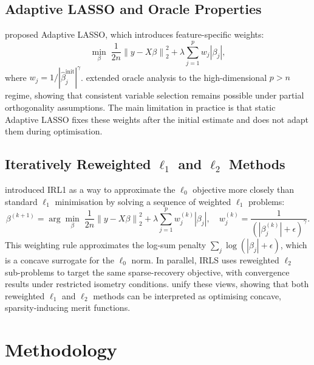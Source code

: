 \documentclass[12pt,a4paper]{article}
\newcommand{\norm}[1]{\left\|#1\right\|}
\newcommand{\abs}[1]{\left|#1\right|}
\begin{document}
\subsection{Adaptive LASSO and Oracle Properties}

\citet{zou2006} proposed Adaptive LASSO, which introduces feature-specific weights:
\begin{equation}
    \min_{\beta} \; \frac{1}{2n}\norm{y - X\beta}_2^2
    + \lambda \sum_{j=1}^{p} w_j \abs{\beta_j},
    \label{eq:adalasso}
\end{equation}
where $w_j = 1/\abs{\hat{\beta}_j^{\mathrm{init}}}^\gamma$.  \citet{huang2008} extended
oracle analysis to the high-dimensional $p > n$ regime, showing that consistent
variable selection remains possible under partial orthogonality assumptions.  The main
limitation in practice is that static Adaptive LASSO fixes these weights after the
initial estimate and does not adapt them during optimisation.

\subsection{Iteratively Reweighted $\ell_1$ and $\ell_2$ Methods}

\citet{candes2008} introduced IRL1 as a way to approximate the $\ell_0$ objective more
closely than standard $\ell_1$ minimisation by solving a sequence of weighted $\ell_1$
problems:
\begin{equation}
    \beta^{(k+1)} = \arg\min_\beta \; \frac{1}{2n}\norm{y - X\beta}_2^2
    + \lambda \sum_{j=1}^{p} w_j^{(k)} \abs{\beta_j}, \quad
    w_j^{(k)} = \frac{1}{\left(\abs{\beta_j^{(k)}} + \epsilon\right)^\gamma}.
    \label{eq:irl1_outer}
\end{equation}
This weighting rule approximates the log-sum penalty
$\sum_j \log(\abs{\beta_j} + \epsilon)$, which is a concave surrogate for the
$\ell_0$ norm.  In parallel, IRLS \citep{daubechies2009} uses reweighted
$\ell_2$ sub-problems to target the same sparse-recovery objective, with convergence
results under restricted isometry conditions.  \citet{wipf2011} unify these views,
showing that both reweighted $\ell_1$ and $\ell_2$ methods can be interpreted as
optimising concave, sparsity-inducing merit functions.

\section{Methodology}
\label{sec:method}
\end{document}
